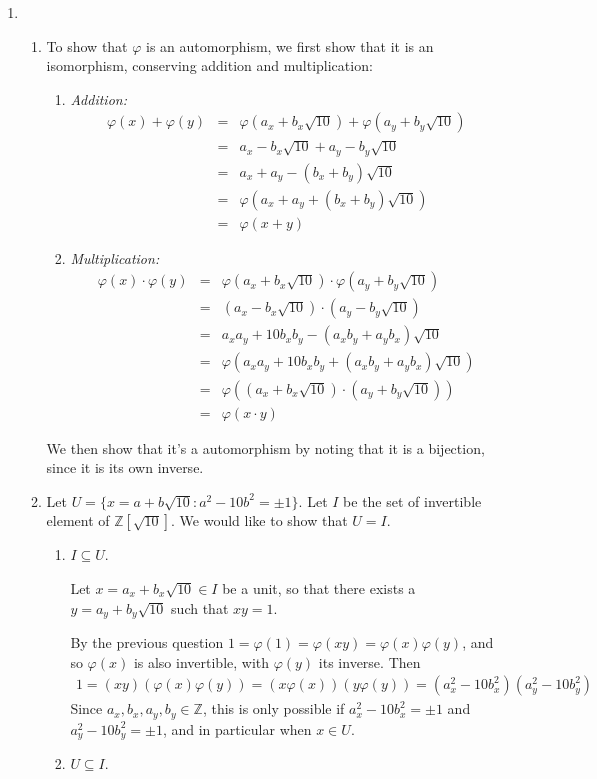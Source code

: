 \documentclass[11pt]{article} \usepackage{amssymb}
\newcommand{\Z}{\mathbb Z} \newcommand{\CalE}{{\mathcal{E}}}
\renewcommand{\phi}{\varphi}
\begin{document}
\begin{enumerate}
  \item
    \begin{enumerate}
      \item To show that $\phi$ is an automorphism, we first show that it
        is an isomorphism,
        conserving addition and multiplication:
        \begin{enumerate}
          \item {\em Addition:} 
            \begin{eqnarray*}
              \phi(x)+\phi(y)&=& \phi(a_x+b_x\sqrt{10})+\phi(a_y+b_y\sqrt{10})
              \\ &=& a_x-b_x\sqrt{10}+a_y-b_y\sqrt{10}
              \\ &=& a_x+a_y-(b_x+b_y)\sqrt{10}
              \\ &=& \phi(a_x+a_y+(b_x+b_y)\sqrt{10})
              \\ &=& \phi(x+y)
            \end{eqnarray*}
          \item {\em Multiplication:} 
            \begin{eqnarray*}
              \phi(x)\cdot\phi(y)
              &=& \phi(a_x+b_x\sqrt{10})\cdot\phi(a_y+b_y\sqrt{10})
              \\ &=& (a_x-b_x\sqrt{10})\cdot(a_y-b_y\sqrt{10})
              \\ &=& a_xa_y+10b_xb_y-(a_xb_y+a_yb_x)\sqrt{10}
              \\ &=& \phi(a_xa_y+10b_xb_y+(a_xb_y+a_yb_x)\sqrt{10})
              \\ &=& \phi((a_x+b_x\sqrt{10})\cdot(a_y+b_y\sqrt{10}))
              \\ &=& \phi(x\cdot y)
            \end{eqnarray*}
        \end{enumerate}
        We then show that it's a automorphism by noting that it is a bijection,
        since it is its own inverse.
      \item 
        Let $U=\{x=a+b\sqrt{10}:a^2-10b^2=\pm1\}$. Let $I$ be the set of invertible
        element of $\Z[\sqrt{10}]$. We would like to show that $U=I$.
        \begin{enumerate}
          \item $I \subseteq U$.

            Let $x=a_x+b_x\sqrt{10}\in I$ be a unit, so that there 
            exists a $y=a_y+b_y\sqrt{10}$ such that $xy=1$. 

            By the previous question $1=\phi(1)=\phi(xy)=\phi(x)\phi(y)$, and 
            so $\phi(x)$ is also invertible, with $\phi(y)$ its inverse. Then
            \begin{eqnarray*}
              1=(xy)(\phi(x)\phi(y))=(x\phi(x))(y\phi(y))
              =(a_x^2-10b_x^2)(a_y^2-10b_y^2)
            \end{eqnarray*}
            Since $a_x,b_x,a_y,b_y\in\Z$, this is only possible if 
            $a_x^2-10b_x^2=\pm 1$ and $a_y^2-10b_y^2=\pm 1$, and in particular when $x\in U$.
          \item $U \subseteq I$.


\end{enumerate}
\end{enumerate}
\end{enumerate}
\end{document}
